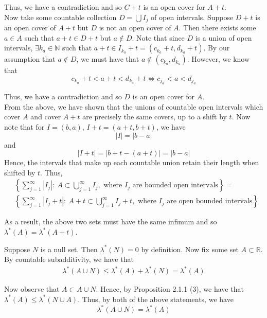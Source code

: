 \documentclass[12pt]{article}
\newenvironment{problem}[2][Problem]{\begin{trivlist}
\item[\hskip \labelsep {\bfseries #1}\hskip \labelsep {\bfseries #2.}]}{\end{trivlist}}
\begin{document}
Thus, we have a contradiction and so $C+t$ is an open cover for $A+t$.\\

Now take some countable collection $D = \bigcup I_j$ of open intervals. Suppose $D + t$ is an open cover of $A + t$ but $D$ is not an open cover of $A$. Then there exists some $a \in A$ such that $a + t \in D + t$ but $a \not\in D$. Note that since $D$ is a union of open intervals, $\exists k_a \in \mathbb{N}$ such that $a + t \in I_{k_a} + t = (c_{k_a} + t, d_{k_a} + t)$. By our assumption that $a \not\in D$, we must have that $a \not\in (c_{k_a}, d_{k_a})$. However, we know that $$c_{k_a} + t < a + t < d_{k_a} + t \iff c_{j_a} < a < d_{j_a}$$
 
Thus, we have a contradiction and so $D$ is an open cover for $A$.\\

From the above, we have shown that the unions of countable open intervals which cover $A$ and cover $A+t$ are precisely the same covers, up to a shift by $t$. Now note that for $I = (b, a)$, $I+t = (a+t, b+t)$, we have $$|I| = |b - a|$$ and $$|I + t| = |b + t - (a + t)| = |b - a|$$ Hence, the intervals that make up each countable union retain their length when shifted by $t$. Thus,
\begin{align*}
&\left\{\sum_{j=1}^{\infty} |I_j|: \ A \subset \bigcup_{j=1}^{\infty} I_j, \text{ where } I_j \text{ are bounded open intervals}\right\} =\\
&\left\{\sum_{j=1}^{\infty} |I_j + t|: \ A+t \subset \bigcup_{j=1}^{\infty} I_j+t, \text{ where } I_j \text{ are open bounded intervals}\right\}
\end{align*}

As a result, the above two sets must have the same infimum and so $\lambda^*(A) = \lambda^*(A+t)$.

\begin{problem}{5}
\end{problem}

Suppose $N$ is a null set. Then $\lambda^*(N) = 0$ by definition. Now fix some set $A \subset \mathbb{R}$. By countable subadditivity, we have that
\begin{align*}
\lambda^*(A \cup N) \leq \lambda^*(A) + \lambda^*(N) = \lambda^*(A)
\end{align*}

Now observe that $A \subset A \cup N$. Hence, by Proposition 2.1.1 (3), we have that $\lambda^*(A) \leq \lambda^*(N \cup A)$. Thus, by both of the above statements, we have $$\lambda^*(A \cup N) = \lambda^*(A)$$
\end{document}

